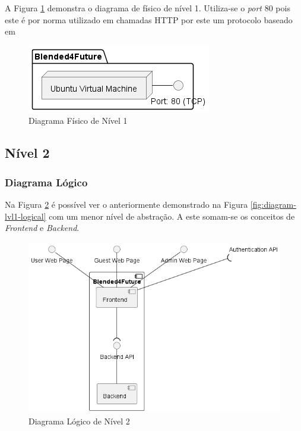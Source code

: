 A Figura \ref{fig:diagram-lvl1-physical} demonstra o diagrama de físico de nível 1. Utiliza-se o \textit{port} 80 pois este é por norma utilizado em chamadas \Acrshort{HTTP} por este um protocolo baseado em 

\begin{figure}[h!tbp]
    \centering
    \includegraphics[width=0.5\linewidth]{capitulos/cap3-analisedoproblema/assets/arquiteturasistema/physical/physical_l1.png}
    \caption{Diagrama Físico de Nível 1}
    \label{fig:diagram-lvl1-physical}
\end{figure}





\subsection{Nível 2}

\subsubsection{Diagrama Lógico}

Na Figura \ref{fig:diagram-lvl2-logical} é possível ver o anteriormente demonstrado na Figura \ref{fig:diagram-lvl1-logical} com um menor nível de abstração.
A este somam-se os conceitos de \textit{Frontend} e \textit{Backend}.

\begin{figure}[h!tbp]
    \centering
    \includegraphics[width=0.7\linewidth]{capitulos/cap3-analisedoproblema/assets/arquiteturasistema/logical/logical_l2.png}
    \caption{Diagrama Lógico de Nível 2}
    \label{fig:diagram-lvl2-logical}
\end{figure}

